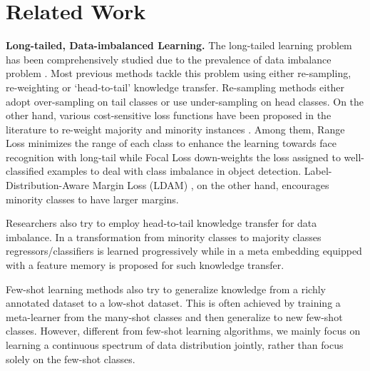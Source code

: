 \documentclass[runningheads]{llncs}
\begin{document}
	\section{Related Work}
	\noindent\textbf{Long-tailed, Data-imbalanced Learning.} \quad The long-tailed learning problem has been comprehensively studied due to the prevalence of data imbalance problem \cite{he2009learning,ouyang2016factors}. Most previous methods tackle this problem using either re-sampling, re-weighting or `head-to-tail' knowledge transfer. Re-sampling methods either adopt over-sampling on tail classes \cite{chawla2002smote,han2005borderline} or use under-sampling \cite{drummond2003c4,tahir2012inverse,jeatrakul2010classification} on head classes. On the other hand, various cost-sensitive loss functions have been proposed in the literature to re-weight majority and minority instances \cite{khan2017cost,zhang2017range,dong2017class,lin2017focal,huang2019deep,cao2019learning,cui2019class}. Among them, 
Range Loss \cite{zhang2017range} minimizes the range of each class to enhance the learning towards face recognition with long-tail while Focal Loss \cite{lin2017focal} down-weights the loss assigned to well-classified examples to deal with class imbalance in object detection.
	Label-Distribution-Aware Margin Loss (LDAM) \cite{cao2019learning}, on the other hand, encourages minority classes to have larger margins.
	
	Researchers also try to employ head-to-tail knowledge transfer for data imbalance. In  \cite{wang2016learning,wang2017learning} a transformation from minority classes to majority classes regressors/classifiers is learned progressively while in \cite{liu2019large} a meta embedding equipped with a feature memory is proposed for such knowledge transfer. 
	
	Few-shot learning methods \cite{hariharan2017low,finn2017model,gidaris2018dynamic,xiang2019incremental} also try to generalize knowledge from a richly annotated dataset to a low-shot dataset. This is often achieved by training a meta-learner from the many-shot classes and then generalize to new few-shot classes. However, different from few-shot learning algorithms, we mainly focus on learning a continuous spectrum of data distribution jointly, rather than focus solely on the few-shot classes.
\end{document}
